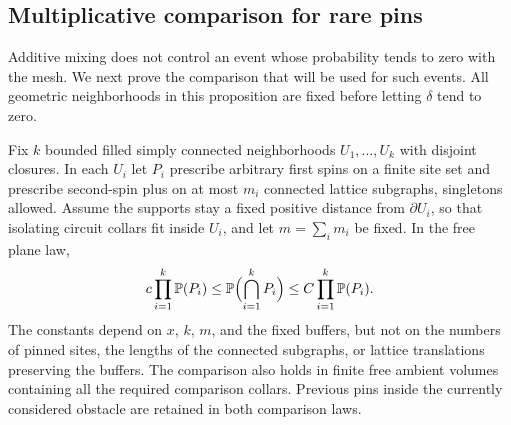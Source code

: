 \subsection{Multiplicative comparison for rare pins}

Additive mixing does not control an event whose probability tends to zero
with the mesh. We next prove the comparison that will be used for such
events. All geometric neighborhoods in this proposition are fixed before
letting $\delta$ tend to zero.

\begin{proposition}\label{prop:rare-pins}
Fix $k$ bounded filled simply connected neighborhoods $U_1,\ldots,U_k$
with disjoint closures. In each $U_i$ let $P_i$ prescribe arbitrary first
spins on a finite site set and prescribe second-spin plus on at most
$m_i$ connected lattice subgraphs, singletons allowed. Assume the
supports stay a fixed positive distance from $\partial U_i$, so that
isolating circuit collars fit inside $U_i$, and let $m=\sum_i m_i$ be
fixed. In the free plane law,
\begin{equation}\label{discrete:rare-pins}
 c\prod_{i=1}^k\mathbb P(P_i)
 \le \mathbb P\Bigl(\bigcap_{i=1}^kP_i\Bigr)
 \le C\prod_{i=1}^k\mathbb P(P_i).
\end{equation}
The constants depend on $x$, $k$, $m$, and the fixed buffers, but not on
the numbers of pinned sites, the lengths of the connected subgraphs, or
lattice translations preserving the buffers. The comparison also holds
in finite free ambient volumes containing all the required comparison
collars. Previous pins inside the currently considered obstacle are
retained in both comparison laws.
\end{proposition}
